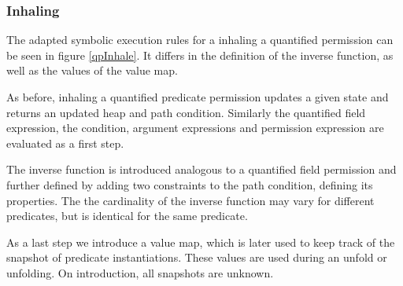 \documentclass[12pt]{article}
\begin{document}
\subsubsection{Inhaling}
The adapted symbolic execution rules for a inhaling a quantified permission can be seen in figure \ref{qpInhale}. It differs in the definition of the inverse function, as well as the values of the value map.

As before, inhaling a quantified predicate permission updates a given state and returns an updated heap and path condition. Similarly the quantified field expression, the condition, argument expressions and permission expression are evaluated as a first step.

The inverse function is introduced analogous to a quantified field permission and further defined by adding two constraints to the path condition, defining its properties. The the cardinality of the inverse function may vary for different predicates, but is identical for the same predicate.

As a last step we introduce a value map, which is later used to keep track of the snapshot of predicate instantiations. These values are used during an unfold or unfolding. On introduction, all snapshots are unknown.
\end{document}
